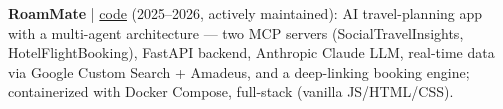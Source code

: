 \item \textbf{RoamMate} | \href{https://github.com/Rontor3}{code} (2025--2026, actively maintained): AI travel-planning app with a multi-agent architecture --- two MCP servers (SocialTravelInsights, HotelFlightBooking), FastAPI backend, Anthropic Claude LLM, real-time data via Google Custom Search + Amadeus, and a deep-linking booking engine; containerized with Docker Compose, full-stack (vanilla JS/HTML/CSS).
